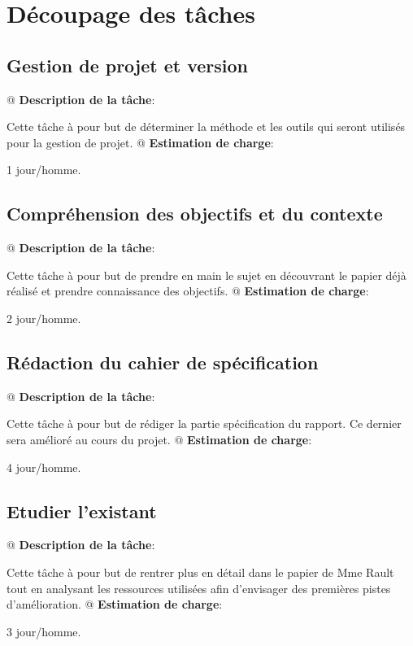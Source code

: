 \documentclass[final]{polytech/polytech}
\begin{document}
	\section{Découpage des tâches}
		\subsection{Gestion de projet et version}
			\begin{easylist}
				@ \textbf{Description de la tâche}:
				
				Cette tâche à pour but de déterminer la méthode et les outils qui seront utilisés pour la gestion de projet.
				@ \textbf{Estimation de charge}:
				
				1 jour/homme.
			\end{easylist}
			
		\subsection{Compréhension des objectifs et du contexte}
			\begin{easylist}
				@ \textbf{Description de la tâche}:
				
				Cette tâche à pour but de prendre en main le sujet en découvrant le papier déjà réalisé et prendre connaissance des objectifs.
				@ \textbf{Estimation de charge}:
				
				2 jour/homme.
			\end{easylist}
			
		\subsection{Rédaction du cahier de spécification}
			\begin{easylist}
				@ \textbf{Description de la tâche}:
				
				Cette tâche à pour but de rédiger la partie spécification du rapport. Ce dernier sera amélioré au cours du projet.
				@ \textbf{Estimation de charge}:
				
				4 jour/homme.
			\end{easylist}
			
		\subsection{Etudier l’existant}
			\begin{easylist}
				@ \textbf{Description de la tâche}:
				
				Cette tâche à pour but de rentrer plus en détail dans le papier de Mme Rault tout en analysant les ressources utilisées afin d'envisager des premières pistes d'amélioration.
				@ \textbf{Estimation de charge}:
				
				3 jour/homme.
			\end{easylist}
			
\end{document}
